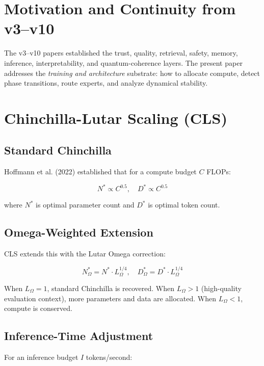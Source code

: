 \documentclass[11pt]{article}
\theoremstyle{plain}
\begin{document}
\section{Motivation and Continuity from v3–v10}

The v3–v10 papers established the trust, quality, retrieval, safety, memory, inference, interpretability, and quantum-coherence layers. The present paper addresses the \emph{training and architecture} substrate: how to allocate compute, detect phase transitions, route experts, and analyze dynamical stability.


\section{Chinchilla-Lutar Scaling (CLS)}

\subsection{Standard Chinchilla}

Hoffmann et al. (2022) established that for a compute budget \( C \) FLOPs:

\begin{equation}
N^* \propto C^{0.5}, \quad D^* \propto C^{0.5}
\end{equation}

where \( N^* \) is optimal parameter count and \( D^* \) is optimal token count.

\subsection{Omega-Weighted Extension}

CLS extends this with the Lutar Omega correction:

\begin{equation}
N^*_\Omega = N^* \cdot L_\Omega^{1/4}, \quad D^*_\Omega = D^* \cdot L_\Omega^{1/4}
\end{equation}

When \( L_\Omega = 1 \), standard Chinchilla is recovered. When \( L_\Omega > 1 \) (high-quality evaluation context), more parameters and data are allocated. When \( L_\Omega < 1 \), compute is conserved.

\subsection{Inference-Time Adjustment}

For an inference budget \( I \) tokens/second:
\end{document}
